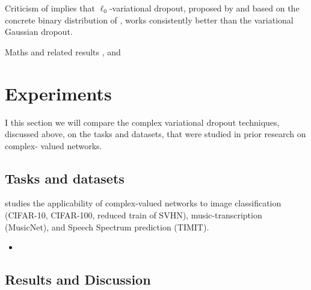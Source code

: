 \documentclass[a4paper,10pt]{article}
\begin{document}
Criticism of \cite{gale_state_2019} implies that $\ell_0$-variational dropout,
proposed by \cite{louizos_learning_2017} and based on the concrete binary distribution
of \cite{maddison_concrete_2016}, works consistently better than the variational
Gaussian dropout.

Maths and related results \cite{pav_moments_2015,taubock_complex-valued_2012},
and \cite{karseras_caution:_nodate}


\section{Experiments} %
\label{sec:Experiments}

I this section we will compare the complex variational dropout techniques, discussed
above, on the tasks and datasets, that were studied in prior research on complex-%
valued networks.

\subsection{Tasks and datasets} %
\label{sub:tasks_and_datasets}

\cite{trabelsi_deep_2017} studies the applicability of complex-valued networks to
image classification (CIFAR-10, CIFAR-100, reduced train of SVHN), music-transcription
(MusicNet), and Speech Spectrum prediction (TIMIT).
\begin{itemize}
  \item 
\end{itemize}


\cite{monning_evaluation_2018}
\cite{jankowski_complex-valued_1996}
\cite{amin_complex-valued_nodate}
\cite{sarroff_complex_nodate}
\cite{lapidoth_capacity_2003}


\subsection{Results and Discussion} %
\label{sub:results_and_discussion}



\clearpage



\nocite{*}
\end{document}
